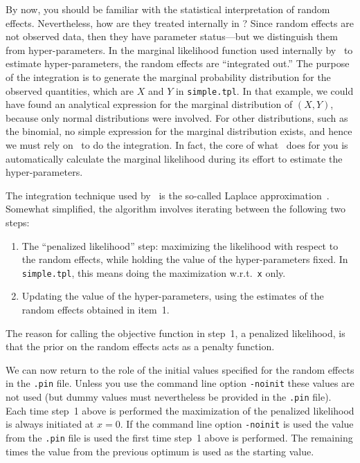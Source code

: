 \documentclass{admbmanual}
\begin{document}
By now, you should be familiar with the statistical interpretation of random
effects. Nevertheless, how are they treated internally in \scAR? Since random
effects are not observed data, then they have parameter status---but we
distinguish them from hyper-parameters. In the marginal likelihood function used
internally by \scAR\ to estimate hyper-parameters, the random effects are
``integrated out.'' The purpose of the integration is to generate the marginal
probability distribution for the observed quantities, which are $X$ and $Y$ in
\texttt{simple.tpl}. In that example, we could have found an analytical
expression for the marginal distribution of $(X,Y)$, because only normal
distributions were involved. For other distributions, such as the binomial, no
simple expression for the marginal distribution exists, and hence we must rely
on \scAB\ to do the integration. In fact, the core of what \scAR\ does for you
is automatically calculate the marginal likelihood during its effort to estimate
the hyper-parameters. 

The integration technique used by \scAR\ is the so-called Laplace
approximation~\cite{skaug_fournier1996aam}. Somewhat simplified, the algorithm
involves iterating between the following two steps:
\begin{enumerate}
  \item The ``penalized likelihood'' step: maximizing the likelihood with
  respect to the random effects, while holding the value of the hyper-parameters
  fixed. In \texttt{simple.tpl}, this means doing the maximization
  w.r.t.~\texttt{x} only.

  \item Updating the value of the hyper-parameters, using the estimates of the
  random effects obtained in item~1.
\end{enumerate}
The reason for calling the objective function in step~1, a penalized likelihood,
is that the prior on the random effects acts as a penalty function.

We can now return to the role of the initial values specified for the random
effects in the \texttt{.pin} file. Unless you use the command line option
\texttt{-noinit} these values are not used (but dummy values must nevertheless
be provided in the \texttt{.pin} file). Each time step~1 above is performed the
maximization of the penalized likelihood is always initiated at $x=0$. If the
command line option \texttt{-noinit} is used the value from the \texttt{.pin}
file is used the first time step~1 above is performed. The remaining times the
value from the previous optimum is used as the starting value.
\end{document}

